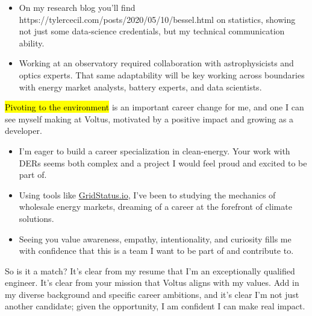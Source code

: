 \documentclass{tc_cv}
\begin{document}
\begin{adjustwidth}{40pt}{40pt}
  \begin{itemize}

    \item On my research blog you'll find \cite{Jupyter
      notebooks}{https://tylercecil.com/posts/2020/05/10/bessel.html} on
      statistics, showing not just some data-science credentials, but my
      technical communication ability.

    \item Working at an observatory required collaboration with astrophysicists
      and optics experts. That same adaptability will be key working across
      boundaries with energy market analysts, battery experts, and data
      scientists.

  \end{itemize} \medskip

  \hl{Pivoting to the environment} is an important career change for me, and
  one I can see myself making at Voltus, motivated by a positive impact
  and growing as a developer.
  \begin{itemize}

    \item I'm eager to build a career specialization in clean-energy. Your work
      with DERs seems both complex and a project I would feel proud and excited
      to be part of.

    \item Using tools like
      \href{http://gridwatch.io}{GridStatus.io}, I've been
      to studying the mechanics of wholesale energy markets, dreaming of a
      career at the forefront of climate solutions.

    \item Seeing you value awareness, empathy, intentionality, and curiosity
      fills me with confidence that this is a team I want to be part of and
      contribute to.

  \end{itemize} \medskip

  So is it a match? It's clear from my resume that I'm an exceptionally
  qualified engineer. It's clear from your mission that Voltus aligns with my
  values. Add in my diverse background and specific career ambitions, and it's
  clear I'm not just another candidate; given the opportunity, I am confident I
  can make real impact. \medskip


\end{adjustwidth}
\end{document}
